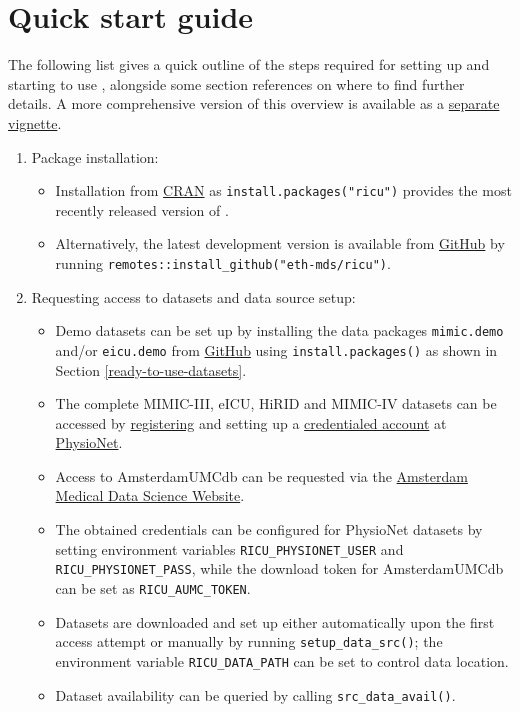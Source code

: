 \documentclass[
  notitle,
  nojss,
  noheadings]{jss}
\begin{document}
\hypertarget{quick-start-guide}{%
\section{Quick start guide}\label{quick-start-guide}}

The following list gives a quick outline of the steps required for
setting up and starting to use , alongside some section
references on where to find further details. A more comprehensive
version of this overview is available as a
\href{https://CRAN.R-project.org/package=ricu/vignettes/ricu.html}{separate
vignette}.

\begin{enumerate}
\def\labelenumi{\arabic{enumi}.}
\item
  Package installation:

  \begin{itemize}
  \item
    Installation from \href{https://CRAN.R-project.org}{CRAN} as
    \texttt{install.packages("ricu")} provides the most recently
    released version of .
  \item
    Alternatively, the latest development version is available from
    \href{https://github.com/eth-mds/ricu}{GitHub} by running
    \texttt{remotes::install\_github("eth-mds/ricu")}.
  \end{itemize}
\item
  Requesting access to datasets and data source setup:

  \begin{itemize}
  \item
    Demo datasets can be set up by installing the data packages
    \texttt{mimic.demo} and/or \texttt{eicu.demo} from
    \href{\%22https://eth-mds.github.io/physionet-demo\%22}{GitHub}
    using \texttt{install.packages()} as shown in Section
    \ref{ready-to-use-datasets}.
  \item
    The complete MIMIC-III, eICU, HiRID and MIMIC-IV datasets can be
    accessed by \href{https://physionet.org/register}{registering} and
    setting up a
    \href{https://physionet.org/settings/credentialing}{credentialed
    account} at \href{https://physionet.org}{PhysioNet}.
  \item
    Access to AmsterdamUMCdb can be requested via the
    \href{https://amsterdammedicaldatascience.nl/\#amsterdamumcdb}{Amsterdam
    Medical Data Science Website}.
  \item
    The obtained credentials can be configured for PhysioNet datasets by
    setting environment variables \texttt{RICU\_PHYSIONET\_USER} and
    \texttt{RICU\_PHYSIONET\_PASS}, while the download token for
    AmsterdamUMCdb can be set as \texttt{RICU\_AUMC\_TOKEN}.
  \item
    Datasets are downloaded and set up either automatically upon the
    first access attempt or manually by running
    \texttt{setup\_data\_src()}; the environment variable
    \texttt{RICU\_DATA\_PATH} can be set to control data location.
  \item
    Dataset availability can be queried by calling
    \texttt{src\_data\_avail()}.
  \end{itemize}


\end{enumerate}
\end{document}

